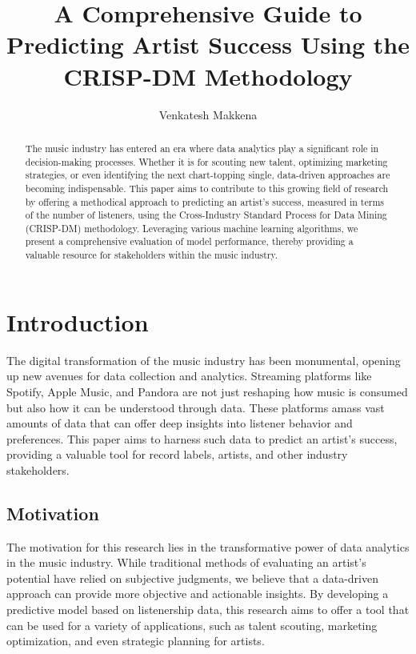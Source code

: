 \documentclass[12pt]{article}
\title{A Comprehensive Guide to Predicting Artist Success Using the CRISP-DM Methodology}
\author{Venkatesh Makkena}
\date{}
\begin{document}
\maketitle

\begin{abstract}
The music industry has entered an era where data analytics play a significant role in decision-making processes. Whether it is for scouting new talent, optimizing marketing strategies, or even identifying the next chart-topping single, data-driven approaches are becoming indispensable. This paper aims to contribute to this growing field of research by offering a methodical approach to predicting an artist's success, measured in terms of the number of listeners, using the Cross-Industry Standard Process for Data Mining (CRISP-DM) methodology. Leveraging various machine learning algorithms, we present a comprehensive evaluation of model performance, thereby providing a valuable resource for stakeholders within the music industry.
\end{abstract}

\newpage

\tableofcontents

\newpage

\section{Introduction}

The digital transformation of the music industry has been monumental, opening up new avenues for data collection and analytics. Streaming platforms like Spotify, Apple Music, and Pandora are not just reshaping how music is consumed but also how it can be understood through data. These platforms amass vast amounts of data that can offer deep insights into listener behavior and preferences. This paper aims to harness such data to predict an artist's success, providing a valuable tool for record labels, artists, and other industry stakeholders.

\subsection{Motivation}

The motivation for this research lies in the transformative power of data analytics in the music industry. While traditional methods of evaluating an artist's potential have relied on subjective judgments, we believe that a data-driven approach can provide more objective and actionable insights. By developing a predictive model based on listenership data, this research aims to offer a tool that can be used for a variety of applications, such as talent scouting, marketing optimization, and even strategic planning for artists.
\end{document}
